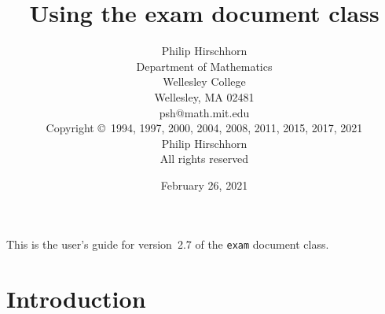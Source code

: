 \documentclass[12pt]{exam}
\newcommand{\docversion}{2.7}
\newcommand{\docdate}{February 26, 2021}
\begin{document}
\title{Using the exam document class}

\author{Philip Hirschhorn\\
  Department of Mathematics\\
  Wellesley College\\
  Wellesley, MA 02481\\
  psh@math.mit.edu\\[\bigskipamount]
  Copyright \copyright~1994, 1997, 2000, 2004, 2008, 2011, 2015, 2017,
  2021\\
  Philip Hirschhorn\\
  All rights reserved}

\date{\docdate}

\maketitle

\begin{center}
  \small
  This is the user's guide for version~\docversion{} of the
  \verb"exam" document class. 
\end{center}

\tableofcontents

\section{Introduction}
\end{document}
